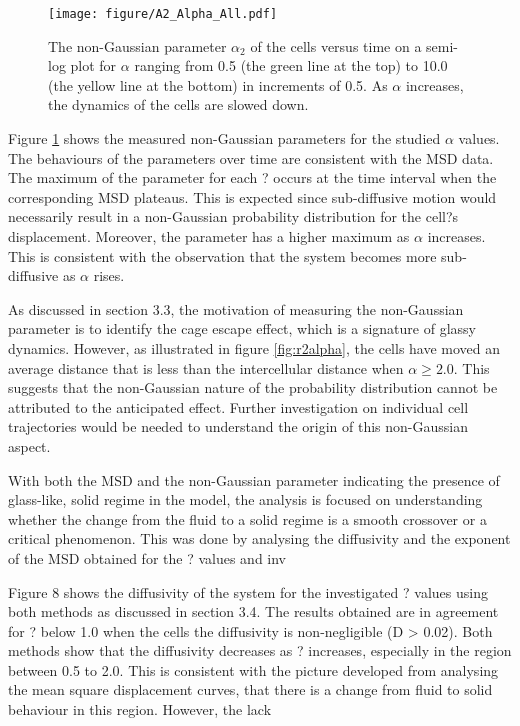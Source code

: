 \documentclass[a4paper,12pt]{article}
\begin{document}
\begin{figure}[h]
\centering
\texttt{[image: figure/A2\_Alpha\_All.pdf]}
\caption{The non-Gaussian parameter $\alpha_2$ of the cells versus time on a semi-log plot for $\alpha$ ranging from 0.5 (the green line at the top) to 10.0 (the yellow line at the bottom) in increments of 0.5. As $\alpha$ increases, the dynamics of the cells are slowed down.}
\label{fig:a2alpha}
\end{figure}

Figure \ref{fig:a2alpha} shows the measured non-Gaussian parameters for the studied $\alpha$ values. The behaviours of the parameters over time are consistent with the MSD data. The maximum of the parameter for each ? occurs at the time interval when the corresponding MSD plateaus. This is expected since sub-diffusive motion would necessarily result in a non-Gaussian probability distribution for the cell?s displacement. Moreover, the parameter has a higher maximum as $\alpha$ increases. This is consistent with the observation that the system becomes more sub-diffusive as $\alpha$ rises. 

As discussed in section 3.3, the motivation of measuring the non-Gaussian parameter is to identify the cage escape effect, which is a signature of glassy dynamics. However, as illustrated in figure \ref{fig:r2alpha}, the cells have moved an average distance that is less than the intercellular distance when $\alpha \ge 2.0$. This suggests that the non-Gaussian nature of the probability distribution cannot be attributed to the anticipated effect. Further investigation on individual cell trajectories would be needed to understand the origin of this non-Gaussian aspect. 



With both the MSD and the non-Gaussian parameter indicating the presence of glass-like, solid regime in the model, the analysis is focused on understanding whether the change from the fluid to a solid regime is a smooth crossover or a critical phenomenon. This was done by analysing the diffusivity and the exponent of the MSD obtained for the ? values and inv

Figure 8 shows the diffusivity of the system for the investigated ? values using both methods as discussed in section 3.4. The results obtained are in agreement for ? below 1.0 when the cells the diffusivity is non-negligible (D > 0.02). Both methods show that the diffusivity decreases as ? increases, especially in the region between 0.5 to 2.0. This is consistent with the picture developed from analysing the mean square displacement curves, that there is a change from fluid to solid behaviour in this region. However, the lack
\end{document}
